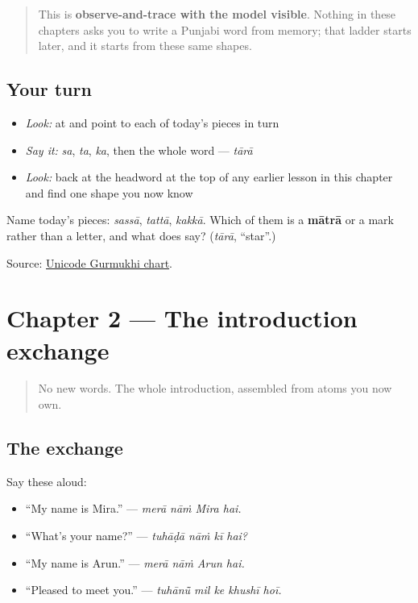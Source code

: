 \begin{quote}
This is \textbf{observe-and-trace with the model visible}. Nothing in these chapters asks you to write a Punjabi word from memory; that ladder starts later, and it starts from these same shapes.
\end{quote}

\subsection*{Your turn}
\begin{itemize}
\raggedright
  \item \emph{Look:} at \textbf{} and point to each of today's pieces in turn
  \item \emph{Say it:} \emph{sa}, \emph{ta}, \emph{ka}, then the whole word — \emph{tārā}
  \item \emph{Look:} back at the headword at the top of any earlier lesson in this chapter and find one shape you now know
\end{itemize}

\begin{tcolorbox}[breakable,colback=teal!4,colframe=teal!35!black,title={Before you move on}]
Name today's pieces: \emph{sassā}, \emph{tattā}, \emph{kakkā}. Which of them is a \textbf{mātrā} or a mark rather than a letter, and what does \textbf{} say? (\emph{tārā}, “star”.)

Source: \href{https://www.unicode.org/charts/PDF/U0A00.pdf}{Unicode Gurmukhi chart}.
\end{tcolorbox}
\section[Practice]{Chapter 2 — The introduction exchange}

\label{lesson:PA-C02-practice}



\begin{quote}
No new words. The whole introduction, assembled from atoms you now own.
\end{quote}

\subsection*{The exchange}
Say these aloud:

\begin{itemize}
\raggedright
  \item \textquotedblleft{}My name is Mira.\textquotedblright{} — \emph{merā nāṁ Mira hai.}
  \item \textquotedblleft{}What's your name?\textquotedblright{} — \emph{tuhāḍā nāṁ kī hai?}
  \item \textquotedblleft{}My name is Arun.\textquotedblright{} — \emph{merā nāṁ Arun hai.}
  \item \textquotedblleft{}Pleased to meet you.\textquotedblright{} — \emph{tuhānū̃ mil ke khushī hoī.}
\end{itemize}

